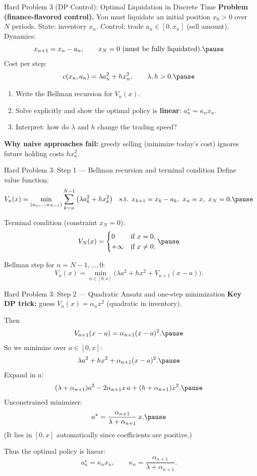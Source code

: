 \documentclass[aspectratio=169]{beamer}
\begin{document}
\begin{frame}{Hard Problem 3 (DP Control): Optimal Liquidation in Discrete Time}
\textbf{Problem (finance-flavored control).}
You must liquidate an initial position $x_0>0$ over $N$ periods.
State: inventory $x_n$.\pause
Control: trade $a_n\in[0,x_n]$ (sell amount).\pause
Dynamics:
\[
x_{n+1}=x_n-a_n,\qquad x_N=0 \text{ (must be fully liquidated).}\pause
\]
Cost per step:
\[
c(x_n,a_n)=\lambda a_n^2 + h x_n^2,
\qquad \lambda,h>0.\pause
\]

\begin{enumerate}
\item Write the Bellman recursion for $V_n(x)$.\pause
\item Solve explicitly and show the optimal policy is \textbf{linear}: $a_n^\star=\kappa_n x_n$.\pause
\item Interpret: how do $\lambda$ and $h$ change the trading speed?\pause
\end{enumerate}

\medskip
\textbf{Why naive approaches fail:}
greedy selling (minimize today’s cost) ignores future holding costs $h x_n^2$.
\end{frame}

\begin{frame}{Hard Problem 3: Step 1 --- Bellman recursion and terminal condition}
Define value function:
\[
V_n(x)=\min_{(a_n,\dots,a_{N-1})}\sum_{k=n}^{N-1}\big(\lambda a_k^2+h x_k^2\big)
\quad \text{s.t. } x_{k+1}=x_k-a_k,\ x_n=x,\ x_N=0.\pause
\]

Terminal condition (constraint $x_N=0$):
\[
V_N(x)=
\begin{cases}
0 & \text{if } x=0,\\
+\infty & \text{if } x\neq 0.
\end{cases}\pause
\]

Bellman step for $n=N-1,\dots,0$:
\[
\boxed{
V_n(x)=\min_{a\in[0,x]}
\Big(\lambda a^2+h x^2+V_{n+1}(x-a)\Big).}
\]
\end{frame}

\begin{frame}{Hard Problem 3: Step 2 --- Quadratic Ansatz and one-step minimization}
\textbf{Key DP trick:} guess $V_n(x)=\alpha_n x^2$ (quadratic in inventory).\pause

Then
\[
V_{n+1}(x-a)=\alpha_{n+1}(x-a)^2.\pause
\]
So we minimize over $a\in[0,x]$:
\[
\lambda a^2 + h x^2 + \alpha_{n+1}(x-a)^2.\pause
\vspace{-5mm}
\]
Expand in $a$:
\[
(\lambda+\alpha_{n+1})a^2 -2\alpha_{n+1}x\,a + (h+\alpha_{n+1})x^2.\pause
\]
Unconstrained minimizer:
\vspace{-3mm}
\[
a^\star
=
\frac{\alpha_{n+1}}{\lambda+\alpha_{n+1}}\,x.\pause
\]
(It lies in $[0,x]$ automatically since coefficients are positive.)

Thus the optimal policy is linear:
\[
\boxed{a_n^\star=\kappa_n x_n,\qquad \kappa_n=\frac{\alpha_{n+1}}{\lambda+\alpha_{n+1}}.}
\]
\end{frame}
\end{document}
